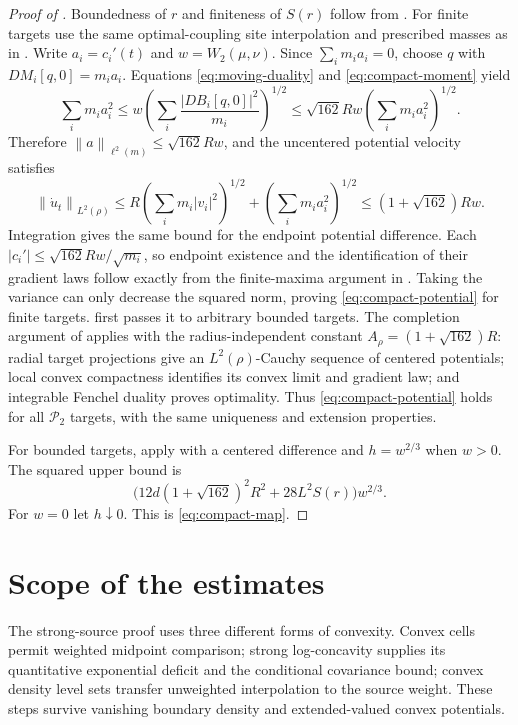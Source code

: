 \documentclass[11pt]{article}
\numberwithin{equation}{section}
\theoremstyle{remark}
\newcommand{\Prob}{\mathcal P}
\newcommand{\norm}[1]{\left\lVert #1\right\rVert}
\begin{document}
\begin{proof}[Proof of ]
Boundedness of $r$ and finiteness of $S(r)$ follow from . For finite targets use the same optimal-coupling site interpolation and prescribed masses as in . Write $a_i=c_i'(t)$ and $w=W_2(\mu,\nu)$. Since $\sum_i m_i a_i=0$, choose $q$ with $DM_i[q,0]=m_i a_i$. Equations \eqref{eq:moving-duality} and \eqref{eq:compact-moment} yield
\[
 \sum_i m_i a_i^2
 \le w\left(\sum_i\frac{|DB_i[q,0]|^2}{m_i}\right)^{1/2}
 \le\sqrt{162}Rw\left(\sum_i m_i a_i^2\right)^{1/2}.
\]
Therefore $\norm a_{\ell^2(m)}\le\sqrt{162}Rw$, and the uncentered potential velocity satisfies
\[
 \norm{\dot u_t}_{L^2(\rho)}
 \le R\left(\sum_i m_i|v_i|^2\right)^{1/2}
      +\left(\sum_i m_i a_i^2\right)^{1/2}
 \le(1+\sqrt{162})Rw.
\]
Integration gives the same bound for the endpoint potential difference. Each $|c_i'|\le\sqrt{162}Rw/\sqrt{m_i}$, so endpoint existence and the identification of their gradient laws follow exactly from the finite-maxima argument in . Taking the variance can only decrease the squared norm, proving \eqref{eq:compact-potential} for finite targets.  first passes it to arbitrary bounded targets. The completion argument of  applies with the radius-independent constant $A_\rho=(1+\sqrt{162})R$: radial target projections give an $L^2(\rho)$-Cauchy sequence of centered potentials; local convex compactness identifies its convex limit and gradient law; and integrable Fenchel duality proves optimality. Thus \eqref{eq:compact-potential} holds for all $\Prob_2$ targets, with the same uniqueness and extension properties.

For bounded targets, apply  with a centered difference and $h=w^{2/3}$ when $w>0$. The squared upper bound is
\[
 \bigl(12d(1+\sqrt{162})^2R^2+28L^2S(r)\bigr)w^{2/3}.
\]
For $w=0$ let $h\downarrow0$. This is \eqref{eq:compact-map}.
\end{proof}

\section{Scope of the estimates}\label{sec:scope}
The strong-source proof uses three different forms of convexity. Convex cells permit weighted midpoint comparison; strong log-concavity supplies its quantitative exponential deficit and the conditional covariance bound; convex density level sets transfer unweighted interpolation to the source weight. These steps survive vanishing boundary density and extended-valued convex potentials.
\end{document}
